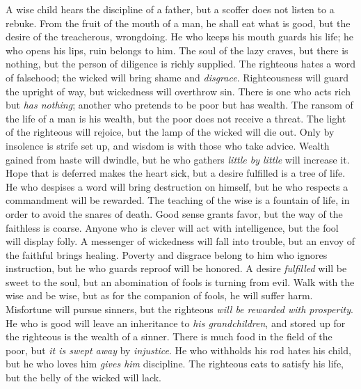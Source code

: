 \begin{biblechapter} %
\verse A wise child hears the discipline of a father, 
but a scoffer does not listen to a rebuke.
\verse From the fruit of the mouth of a man, he shall eat what is good, 
but the desire of the treacherous, wrongdoing.
\verse He who keeps his mouth guards his life; 
he who opens his lips, ruin belongs to him.
\verse The soul of the lazy craves, but there is nothing, 
but the person of diligence is richly supplied.
\verse The righteous hates a word of falsehood; 
the wicked will bring shame and \textit{disgrace}.
\verse Righteousness will guard the upright of way, 
but wickedness will overthrow sin.
\verse There is one who acts rich but \textit{has nothing}; 
another who pretends to be poor but has wealth.
\verse The ransom of the life of a man is his wealth, 
but the poor does not receive a threat.
\verse The light of the righteous will rejoice, 
but the lamp of the wicked will die out.
\verse Only by insolence is strife set up, 
and wisdom is with those who take advice.
\verse Wealth gained from haste will dwindle, 
but he who gathers \textit{little by little} will increase it.
\verse Hope that is deferred makes the heart sick, 
but a desire fulfilled is a tree of life.
\verse He who despises a word will bring destruction on himself, 
but he who respects a commandment will be rewarded.
\verse The teaching of the wise is a fountain of life, 
in order to avoid the snares of death.
\verse Good sense grants favor, 
but the way of the faithless is coarse.
\verse Anyone who is clever will act with intelligence, 
but the fool will display folly.
\verse A messenger of wickedness will fall into trouble, 
but an envoy of the faithful brings healing.
\verse Poverty and disgrace belong to him who ignores instruction, 
but he who guards reproof will be honored.
\verse A desire \textit{fulfilled} will be sweet to the soul, 
but an abomination of fools is turning from evil.
\verse Walk with the wise and be wise, 
but as for the companion of fools, he will suffer harm.
\verse Misfortune will pursue sinners, 
but the righteous \textit{will be rewarded with prosperity}.
\verse He who is good will leave an inheritance to \textit{his grandchildren}, 
and stored up for the righteous is the wealth of a sinner.
\verse There is much food in the field of the poor, 
but \textit{it is swept away} by \textit{injustice}.
\verse He who withholds his rod hates his child, 
but he who loves him \textit{gives him} discipline.
\verse The righteous eats to satisfy his life, 
but the belly of the wicked will lack.
\end{biblechapter}

